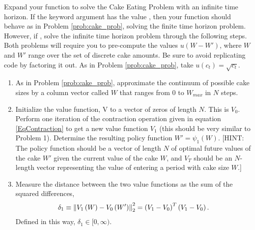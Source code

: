 \begin{problem}
Expand your  function to solve the Cake Eating Problem with an infinite time horizon. If the keyword argument
 has the value , then your function should behave as in Problem \ref{prob:cake_prob}, solving the finite
time horizon problem. However, if , solve the infinite time horizon problem through the following steps.
Both problems will require you to pre-compute the values $u(W - W')$, where $W$ and $W'$ range over the set of discrete cake
amounts. Be sure to avoid replicating code by factoring it out.
As in Problem \ref{prob:cake_prob}, take $u(c_t) = \sqrt{c_t}$.
\begin{enumerate}
\item As in Problem \ref{prob:cake_prob}, approximate the continuum of possible
cake sizes by a column vector called $W$ that ranges from 0 to $W_{max}$ in $N$ steps.

\item \label{item:step2} Initialize the value function, V to a vector of zeros of length $N$.  This is $V_0$.  Perform one iteration
of the contraction operation given in equation \eqref{EqContraction} to get a new value function $V_1$ (this should be very similar
to Problem 1).  Determine the resulting policy function $W' = \psi_1\left(W\right)$.  [HINT: The policy function should be a vector
of length $N$ of optimal future values of the cake $W'$ given the current value of the cake $W$, and $V_T$ should be an $N$-length
vector representing the value of entering a period with cake size $W$.]

\item \label{item:step3} Measure the distance between the two value functions as the sum of the
squared differences,
\begin{equation}
\label{EqDist}
\delta_1\equiv \left\lVert V_1\left(W\right) - V_0\left(W'\right)\right\rVert_2^2 = \left(V_1 - V_0\right)^T\left(V_1 - V_0\right).
\end{equation}
Defined in this way, $\delta_1\in [0,\infty)$.

%


\end{enumerate}
\end{problem}
